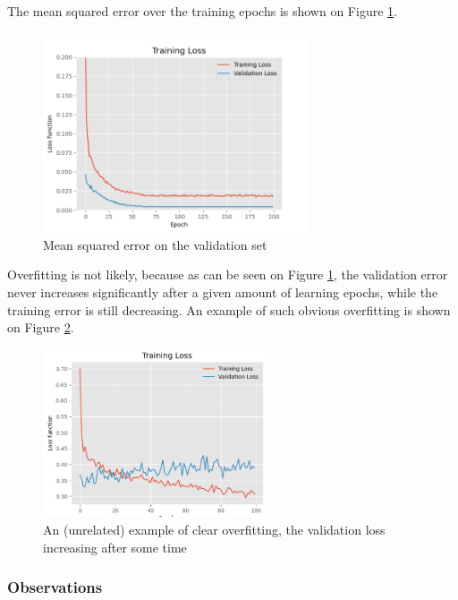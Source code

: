 The mean squared error over the training epochs is shown on Figure \ref{fig:nn-validation-error-curve}.

\begin{figure}[h]
    \centering
    \includegraphics[width=0.7\textwidth]{resources/images/mse-finalarch.png}
    \caption{Mean squared error on the validation set}
    \label{fig:nn-validation-error-curve}
\end{figure}

Overfitting is not likely, because as can be seen on Figure \ref{fig:nn-validation-error-curve}, the validation error never increases significantly after a given amount of learning epochs, while the training error is still decreasing. An example of such obvious overfitting is shown on Figure \ref{fig:overfitting}.

\begin{figure}[h]
    \centering
    \includegraphics[width=0.6\textwidth]{resources/images/overfitting.png}
    \caption{An (unrelated) example of clear overfitting, the validation loss increasing after some time}
    \label{fig:overfitting}
\end{figure}

\subsubsection{Observations}

